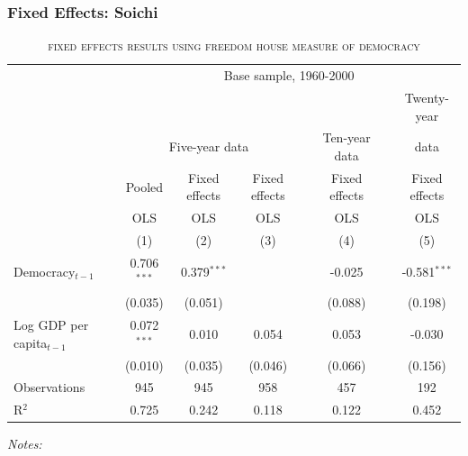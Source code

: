 \subsubsection{Fixed Effects: Soichi}
\begin{table}[h!] \centering
			\begin{adjustbox}{max width=\textwidth}
			\begin{threeparttable}
		\caption{\textsc{fixed effects results using freedom house measure of democracy}}
			\begin{tabular}{l*{7}{c}}
         \toprule
			    & \multicolumn{7}{c}{Base sample, 1960-2000}\\
	     \cline{2-8}
	            & & &&& & &Twenty-year\\[-1.8ex]
				& \multicolumn{3}{c}{Five-year data} && \multicolumn{1}{c}{Ten-year data} && \multicolumn{1}{c}{data}\\
		\cline{2-4}\cline{6-6}\cline{8-8}	
		    &Pooled &Fixed effects &Fixed effects &&Fixed effects &&Fixed effects \\[-1.8ex] 	
		    &OLS &OLS &OLS &&OLS &&OLS \\[-1.8ex] 			 
		        &\multicolumn{1}{c}{(1)} &\multicolumn{1}{c}{(2)} &\multicolumn{1}{c}{(3)} &&\multicolumn{1}{c}{(4)} &&\multicolumn{1}{c}{(5)}\\ 
		\hline        
				Democracy$_{t-1}$ & 0.706$^{***}$ & 0.379$^{***}$ &  && -0.025 && -0.581$^{***}$ \\[-1.8ex] 
				 \ & (0.035) & (0.051) &  && (0.088) && (0.198) \\ 
				Log GDP per capita${}_{t-1}$ & 0.072$^{***}$ & 0.010 & 0.054 && 0.053 && -0.030 \\[-1.8ex] 
				 \ & (0.010) & (0.035) & (0.046) && (0.066) && (0.156) \\ 
				Observations & \multicolumn{1}{c}{945} & \multicolumn{1}{c}{945} & \multicolumn{1}{c}{958} && \multicolumn{1}{c}{457} && \multicolumn{1}{c}{192} \\ 
				R${}^{2}$ & \multicolumn{1}{c}{0.725} & \multicolumn{1}{c}{0.242} & \multicolumn{1}{c}{0.118} && \multicolumn{1}{c}{0.122} && \multicolumn{1}{c}{0.452} \\ 
				\hline 
			\end{tabular}
		\begin{tablenotes}
					    	\item \textit{Notes:} 
		\end{tablenotes}
		\end{threeparttable}	
		\end{adjustbox}
	\end{table}

